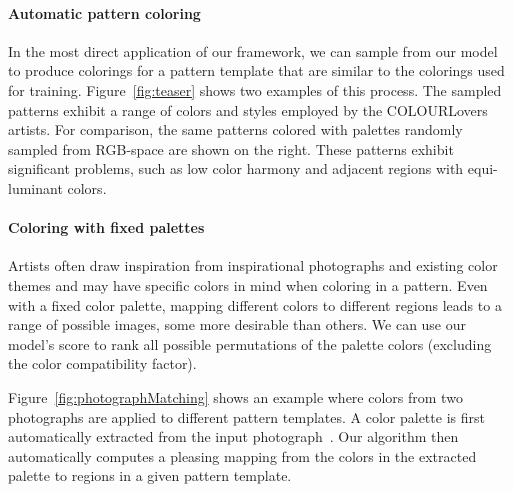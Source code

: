 \paragraph{Automatic pattern coloring} In the most direct application of our framework, we can sample from our model to produce colorings for a pattern template that are similar to the colorings used for training. Figure~\ref{fig:teaser} shows two examples of this process. The sampled patterns exhibit a range of colors and styles employed by the COLOURLovers artists. For comparison, the same patterns colored with palettes randomly sampled from RGB-space are shown on the right. These patterns exhibit significant problems, such as low color harmony and adjacent regions with equi-luminant colors.



\paragraph{Coloring with fixed palettes} 


Artists often draw inspiration from inspirational photographs and existing color themes and may have specific colors in mind when coloring in a pattern. Even with a fixed color palette, mapping different colors to different regions leads to a range of possible images, some more desirable than others. We can use our model's score to rank all possible permutations of the palette colors (excluding the color compatibility factor).

Figure~\ref{fig:photographMatching} shows an example where colors from two photographs are applied to different pattern templates. A color palette is first automatically extracted from the input photograph~\cite{SharonPaletteExtraction}. Our algorithm then automatically computes a pleasing mapping from the colors in the extracted palette to regions in a given pattern template.

